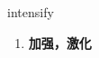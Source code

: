 
\begin{frame}
{\huge intensify}
\begin{center}
\begin{enumerate}\Large
  \item \textbf{加强，激化}
\end{enumerate}
\end{center}
\end{frame}

